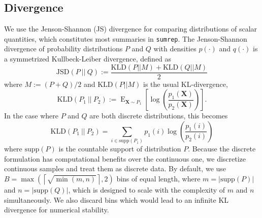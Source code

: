 \documentclass{article}
\begin{document}
\subsection*{Divergence}
We use the Jenson-Shannon (JS) divergence for comparing distributions of scalar quantities, which constitutes most summaries in \texttt{sumrep}.
The Jenson-Shannon divergence of probability distributions $P$ and $Q$ with densities $p(\cdot)$ and $q(\cdot)$ is a symmetrized Kullbeck-Leiber divergence, defined as
\begin{equation}
\text{JSD}\left(P \ || \ Q\right) := \frac{\text{KLD}\left(P || M\right) + \text{KLD}\left(Q || M\right)}{2}
\end{equation}
where $M := (P + Q)/2$ and $\text{KLD}(P || M)$ is the usual KL-divergence,
\begin{equation}
\text{KLD}\left(P_1 \ || \ P_2\right) := \operatorname{E}_{\mathbf X \sim P_1}\left[ \log\left(\frac{p_1(\mathbf X)}{p_2(\mathbf X)}\right) \right].
\end{equation}
In the case where $P$ and $Q$ are both discrete distributions, this becomes
\begin{equation}
\text{KLD}\left(P_1 \ || \ P_2\right) = \sum_{i \in \text{supp}(P_1)} p_1(i) \log\left( \frac{p_1(i)}{p_2(i)} \right)
\end{equation}
where $\text{supp}(P)$ is the countable support of distribution $P$.
Because the discrete formulation has computational benefits over the continuous one, we discretize continuous samples and treat them as discrete data.
By default, we use $B = \max\left(\left\lceil \sqrt{\min(m, n)} \right \rceil, 2\right)$ bins of equal length, where $m = |\text{supp}(P)|$ and $n = |\text{supp}(Q)|$, which is designed to scale with the complexity of $m$ and $n$ simultaneously.
We also discard bins which would lead to an infinite KL divergence for numerical stability.
\end{document}
